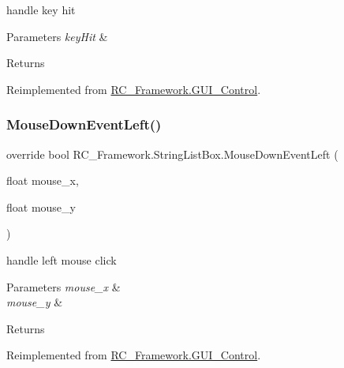 handle key hit 


\begin{DoxyParams}{Parameters}
{\em key\+Hit} & \\
\hline
\end{DoxyParams}
\begin{DoxyReturn}{Returns}

\end{DoxyReturn}


Reimplemented from \mbox{\hyperlink{class_r_c___framework_1_1_g_u_i___control_a458eb00bda180db22ebe22e550a669a4}{R\+C\+\_\+\+Framework.\+G\+U\+I\+\_\+\+Control}}.

\mbox{\label{class_r_c___framework_1_1_string_list_box_aabe8c72a90d47c67eb162c76b1e7f79c}} 
\subsubsection{\texorpdfstring{Mouse\+Down\+Event\+Left()}{MouseDownEventLeft()}}
{\footnotesize\ttfamily override bool R\+C\+\_\+\+Framework.\+String\+List\+Box.\+Mouse\+Down\+Event\+Left (\begin{DoxyParamCaption}\item[{float}]{mouse\+\_\+x,  }\item[{float}]{mouse\+\_\+y }\end{DoxyParamCaption})\hspace{0.3cm}{\ttfamily [virtual]}}



handle left mouse click 


\begin{DoxyParams}{Parameters}
{\em mouse\+\_\+x} & \\
\hline
{\em mouse\+\_\+y} & \\
\hline
\end{DoxyParams}
\begin{DoxyReturn}{Returns}

\end{DoxyReturn}


Reimplemented from \mbox{\hyperlink{class_r_c___framework_1_1_g_u_i___control_a005e7f109afd21abd6576fdf70212af5}{R\+C\+\_\+\+Framework.\+G\+U\+I\+\_\+\+Control}}.

